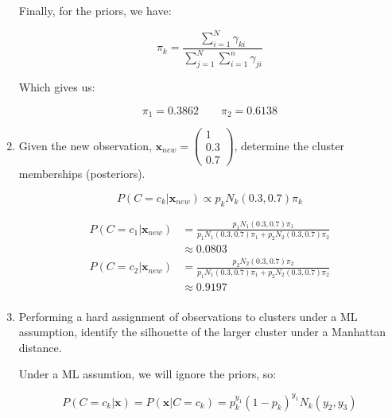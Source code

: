 \documentclass[12pt]{article}
\begin{document}
\begin{enumerate}[leftmargin=\labelsep]
    Finally, for the priors, we have:

    \begin{equation}
        \pi_k = \frac{\sum_{i=1}^{N}\gamma_{ki}}{\sum_{j=1}^{N}\sum_{i=1}^{n}\gamma_{ji}}
    \end{equation}

    Which gives us:

    \begin{equation}
        \pi_1 = 0.3862 \qquad \pi_2 = 0.6138
    \end{equation}

    \item Given the new observation, $\mathbf{x}_{new} = \begin{pmatrix}
        1 \\ 0.3 \\ 0.7 \end{pmatrix}$, determine the cluster memberships (posteriors).

        \begin{equation}
            P(C = c_k | \mathbf{x}_{new}) \propto p_kN_k(0.3, 0.7)\pi_k
        \end{equation}

        \begin{equation}
        \begin{aligned}
            P(C = c_1 | \mathbf{x}_{new}) &= \frac{p_1N_1(0.3, 0.7)\pi_1}{p_1N_1(0.3, 0.7)\pi_1 + p_2N_2(0.3, 0.7)\pi_2} \\
            &\approx 0.0803 \\
            P(C = c_2 | \mathbf{x}_{new}) &= \frac{p_2N_2(0.3, 0.7)\pi_2}{p_1N_1(0.3, 0.7)\pi_1 + p_2N_2(0.3, 0.7)\pi_2} \\
            &\approx 0.9197 \\
        \end{aligned}
        \end{equation}
    
    \item Performing a hard assignment of observations to clusters under a ML assumption, identify
    the silhouette of the larger cluster under a Manhattan distance.

    Under a ML assumtion, we will ignore the priors, so:

    \begin{equation}
        P(C = c_k|\mathbf{x}) = P(\mathbf{x}|C = c_k) = p_k^{y_1}(1-p_k)^{y_1}N_k(y_2, y_3)
    \end{equation}


\end{enumerate}
\end{document}
